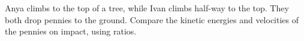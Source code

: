Anya climbs to the top of a tree, while Ivan climbs half-way to the top. They both
        drop pennies to the ground. Compare the kinetic energies and velocities of the
        pennies on impact, using ratios.

